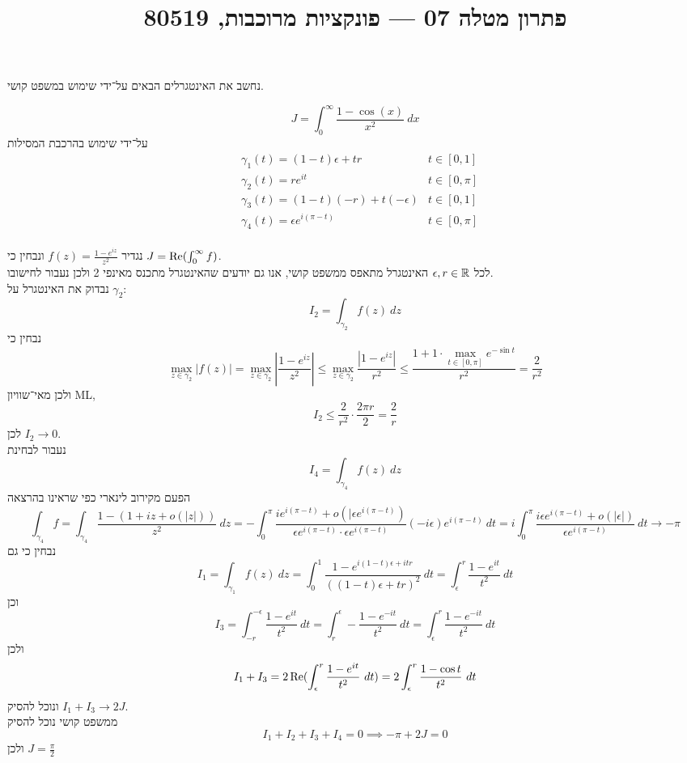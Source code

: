 
\title{פתרון מטלה 07 --- פונקציות מרוכבות, 80519}


\maketitle
\maketitleprint{}

\question{}
נחשב את האינטגרלים הבאים על־ידי שימוש במשפט קושי.

\subquestion{}
\[
	J = \int_0^\infty \frac{1 - \cos(x)}{x^2}\ dx
\]
על־ידי שימוש בהרכבת המסילות
\begin{align*}
	& \gamma_1(t) = (1 - t) \epsilon + t r & t \in [0, 1] \\
	& \gamma_2(t) = r e^{it} & t \in [0, \pi] \\
	& \gamma_3(t) = (1 - t) (-r) + t (-\epsilon) & t \in [0, 1] \\
	& \gamma_4(t) = \epsilon e^{i(\pi - t)} & t \in [0, \pi] \\
\end{align*}
\begin{solution}
	נגדיר $f(z) = \frac{1 - e^{iz}}{z^2}$ ונבחין כי $J = \operatorname{Re}(\int_0^\infty f)$. \\
	לכל $\epsilon, r \in \mathbb{R}$ האינטגרל מתאפס ממשפט קושי, אנו גם יודעים שהאינטגרל מתכנס מאינפי 2 ולכן נעבור לחישובו. \\
	נבדוק את האינטגרל על $\gamma_2$:
	\[
		I_2 = \int_{\gamma_2} f(z)\ dz
	\]
	נבחין כי
	\[
		\max_{z \in \gamma_2} |f(z)|
		= \max_{z \in \gamma_2} \left\lvert \frac{1 - e^{iz}}{z^2} \right\rvert
		\le \max_{z \in \gamma_2} \frac{|1 - e^{iz}|}{r^2}
		\le \frac{1 + 1 \cdot \max_{t \in [0, \pi]} e^{-\sin t}}{r^2}
		= \frac{2}{r^2}
	\]
	ולכן מאי־שוויון ML,
	\[
		I_2 \le \frac{2}{r^2} \cdot \frac{2\pi r}{2} = \frac{2}{r}
	\]
	לכן $I_2 \to 0$. \\
	נעבור לבחינת
	\[
		I_4 = \int_{\gamma_4} f(z)\ dz
	\]
	הפעם מקירוב לינארי כפי שראינו בהרצאה
	\[
		\int_{\gamma_4} f
		= \int_{\gamma_4} \frac{1 - (1 + iz + o(|z|))}{z^2}\ dz
		= -\int_0^\pi \frac{i e^{i(\pi - t)} + o(|\epsilon e^{i(\pi - t)})}{\epsilon e^{i(\pi - t)} \cdot \epsilon e^{i(\pi - t)}} (-i \epsilon) e^{i(\pi - t)}\ dt
		= i \int_0^\pi \frac{i \epsilon e^{i(\pi - t)} + o(|\epsilon|)}{\epsilon e^{i(\pi - t)}}\ dt
		\to -\pi
	\]
	נבחין כי גם
	\[
		I_1 = \int_{\gamma_1} f(z)\ dz
		= \int_0^1 \frac{1 - e^{i(1 - t)\epsilon + itr}}{{((1 - t)\epsilon + tr)}^2}\ dt
		= \int_\epsilon^r \frac{1 - e^{it}}{t^2}\ dt
	\]
	וכן
	\[
		I_3
		= \int_{-r}^{-\epsilon} \frac{1 - e^{it}}{t^2}\ dt
		= \int_{r}^{\epsilon} -\frac{1 - e^{-it}}{t^2}\ dt
		= \int_{\epsilon}^r \frac{1 - e^{-it}}{t^2}\ dt
	\]
	ולכן
	\[
		I_1 + I_3
		= 2 \operatorname{Re}(\int_\epsilon^r \frac{1 - e^{it}}{t^2}\ dt)
		= 2 \int_\epsilon^r \frac{1 - \cos t}{t^2}\ dt
	\]
	ונוכל להסיק $I_1 + I_3 \to 2 J$. \\
	ממשפט קושי נוכל להסיק
	\[
		I_1 + I_2 + I_3 + I_4 = 0
		\implies
		-\pi + 2 J = 0
	\]
	ולכן $J = \frac{\pi}{2}$
\end{solution}

